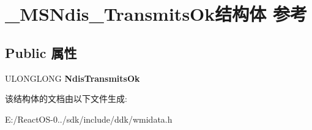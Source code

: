 \hypertarget{struct___m_s_ndis___transmits_ok}{}\section{\+\_\+\+M\+S\+Ndis\+\_\+\+Transmits\+Ok结构体 参考}
\label{struct___m_s_ndis___transmits_ok}
\subsection*{Public 属性}
\begin{DoxyCompactItemize}
\item 
\mbox{\label{struct___m_s_ndis___transmits_ok_ace0f896c3ded6306be520b7e913e0c32}} 
U\+L\+O\+N\+G\+L\+O\+NG {\bfseries Ndis\+Transmits\+Ok}
\end{DoxyCompactItemize}


该结构体的文档由以下文件生成\+:\begin{DoxyCompactItemize}
\item 
E\+:/\+React\+O\+S-\/0../sdk/include/ddk/wmidata.\+h\end{DoxyCompactItemize}
